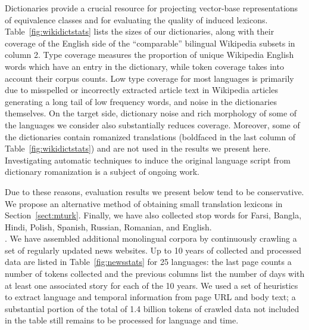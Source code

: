 \documentclass{article}
\newcommand{\mnote}[1]{\marginpar{%
  \vskip-\baselineskip
  \raggedright\footnotesize
  \itshape\hrule\smallskip\tiny{#1}\par\smallskip\hrule}}
\newcommand{\mtodo}[1]{\mnote{\textcolor{red}{#1}}}
\newcommand{\secref}[1]{Section~\ref{#1}}
\newcommand{\tabref}[1]{Table~\ref{#1}}
\begin{document}

  Dictionaries provide a crucial resource for projecting vector-base representations of equivalence classes and for evaluating the quality of induced lexicons.  \tabref{fig:wikidictstats} lists the sizes of our dictionaries, along with their coverage of the English side of the ``comparable'' bilingual Wikipedia subsets in column 2.  Type coverage measures the proportion of unique Wikipedia English words which have an entry in the dictionary, while token coverage takes into account their corpus counts. Low type coverage for most languages is primarily due to misspelled or incorrectly extracted article text in Wikipedia articles generating a long tail of low frequency words, and noise in the dictionaries themselves.  On the target side, dictionary noise and rich morphology of some of the languages we consider also substantially reduces coverage.  Moreover, some of the dictionaries contain romanized translations (boldfaced in the last column of \tabref{fig:wikidictstats}) and are not used in the results we present here.  Investigating automatic techniques to induce the original language script from dictionary romanization is a subject of ongoing work.


Due to these reasons, evaluation results we present below tend to be conservative.  We propose an alternative method of obtaining small translation lexicons in \secref{sect:mturk}.  Finally, we have also collected stop words for Farsi, Bangla, Hindi, Polish, Spanish, Russian, Romanian, and English.\\

.  We have assembled additional monolingual corpora by continuously crawling a set of regularly updated news websites.  Up to 10 years of collected and processed data are listed in \tabref{fig:newsstats} for 25 languages: the last page counts a number of tokens collected and the previous columns list the number of days with at least one associated story for each of the 10 years.  We used a set of heuristics to extract language and temporal information from page URL and body text; a substantial portion of the total of 1.4 billion tokens of crawled data not included in the table still remains to be processed for language and time.\\
\end{document}

